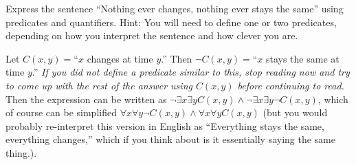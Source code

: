 \begin{requ}
Express the sentence ``Nothing ever changes, nothing ever stays the same'' using predicates and quantifiers.
Hint: You will need to define one or two predicates, depending on how you interpret the sentence and how clever you are.
\begin{requanswer}
Let $C(x,y)=$``$x$ changes at time $y$.'' 
Then $\neg C(x,y)=$``$x$ stays the same at time $y$.''
{\em If you did not define a predicate similar to this, stop reading now
and try to come up with the rest of the answer using $C(x,y)$ before continuing to read.}
Then the expression can be written as $\neg\exists x\exists y  C(x,y)\wedge \neg\exists x\exists y \neg C(x,y)$,
which of course can be simplified $\forall x\forall y \neg C(x,y) \wedge \forall x \forall y C(x,y)$
(but you would probably re-interpret this version in English as ``Everything stays the same, everything changes,''
which if you think about is it essentially saying the same thing.).
\end{requanswer}
\end{requ}

